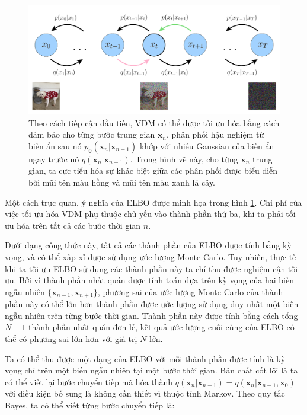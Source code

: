 \documentclass[14pt, a4paper]{article}
\numberwithin{equation}{section}
\numberwithin{figure}{section}
\numberwithin{dl}{section}
\numberwithin{md}{section}
\numberwithin{bd}{section}
\numberwithin{dn}{section}
\numberwithin{hq}{section}
\begin{document}
    \begin{figure}[h!]
        \centering
        \includegraphics[scale=0.5]{VDM-Optimize.png}
        \caption{Theo cách tiếp cận đầu tiên, VDM có thể được tối ưu hóa bằng cách đảm bảo cho từng bước trung gian $\boldsymbol{x}_n$, phân phối hậu nghiệm từ biến ẩn sau nó $p_{\boldsymbol{\theta}} (\boldsymbol{x}_n \vert \boldsymbol{x}_{n+1})$ khớp với nhiễu Gaussian của biến ẩn ngay trước nó $q(\boldsymbol{x}_{n} \vert \boldsymbol{x}_{n-1})$.
        Trong hình vẽ này, cho từng $\boldsymbol{x}_n$ trung gian, ta cực tiểu hóa sự khác biệt giữa các phân phối được biểu diễn bởi mũi tên màu hồng và mũi tên màu xanh lá cây.}
        \label{fig:VDM-Optimize}
    \end{figure}

    Một cách trực quan, ý nghĩa của ELBO được minh họa trong hình \ref{fig:VDM-Optimize}.
    Chi phí của việc tối ưu hóa VDM phụ thuộc chủ yếu vào thành phần thứ ba, khi ta phải tối ưu hóa trên tất cả các bước thời gian $n$.

    Dưới dạng công thức này, tất cả các thành phần của ELBO được tính bằng kỳ vọng, và có thể xấp xỉ được sử dụng ước lượng Monte Carlo.
    Tuy nhiên, thực tế khi ta tối ưu ELBO sử dụng các thành phần này ta chỉ thu được nghiệm cận tối ưu.
    Bởi vì thành phần nhất quán được tính toán dựa trên kỳ vọng của hai biến ngẫu nhiên $\lbrace \boldsymbol{x}_{n-1}, \boldsymbol{x}_{n+1} \rbrace$, phương sai của ước lượng Monte Carlo của thành phần này có thể lớn hơn thành phần được ước lượng sử dụng duy nhất một biến ngẫu nhiên trên từng bước thời gian.
    Thành phần này được tính bằng cách tổng $N-1$ thành phần nhất quán đơn lẻ, kết quả ước lượng cuối cùng của ELBO có thể có phương sai lớn hơn với giá trị $N$ lớn.

    Ta có thể thu được một dạng của ELBO với mỗi thành phần được tính là kỳ vọng chỉ trên một biến ngẫu nhiên tại một bước thời gian.
    Bản chất cốt lõi là ta có thể viết lại bước chuyển tiếp mã hóa thành $q(\boldsymbol{x}_n \vert \boldsymbol{x}_{n-1})=q(\boldsymbol{x}_n \vert \boldsymbol{x}_{n-1}, \boldsymbol{x}_0)$ với điều kiện bổ sung là không cần thiết vì thuộc tính Markov.
    Theo quy tắc Bayes, ta có thể viết từng bước chuyển tiếp là:
\end{document}
